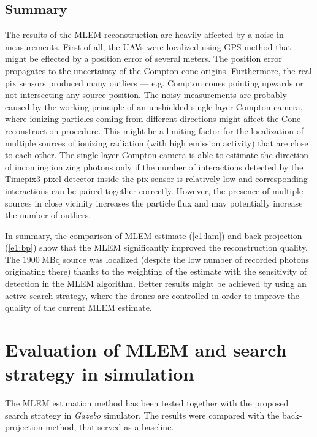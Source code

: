 \subsection{Summary}
The results of the \ac{MLEM} reconstruction are heavily affected by a noise in measurements.
First of all, the \ac{UAV}s were localized using \ac{GPS} method that might be effected by a position error of several meters.
The position error propagates to the uncertainty of the Compton cone origins.
Furthermore, the real \ac{pix} sensors produced many outliers --- e.g. Compton cones pointing upwards or not intersecting any source position. 
The noisy measurements are probably caused by the working principle of an unshielded single-layer Compton camera, where ionizing particles coming from different directions might affect the Cone reconstruction procedure.
This might be a limiting factor for the localization of multiple sources of ionizing radiation (with high emission activity) that are close to each other.
The single-layer Compton camera is able to estimate the direction of incoming ionizing photons only if the number of interactions detected by the Timepix3 pixel detector inside the \ac{pix} sensor is relatively low and corresponding interactions can be paired together correctly.
However, the presence of multiple sources in close vicinity increases the particle flux and may potentially increase the number of outliers.

In summary, the comparison of \ac{MLEM} estimate (\autoref{e1:lam}) and back-projection (\autoref{e1:bp}) show that the \ac{MLEM} significantly improved the reconstruction quality.
The $\SI{1900}{\mega\becquerel}$ source was localized (despite the low number of recorded photons originating there) 
thanks to the weighting of the estimate with the sensitivity of detection in the \ac{MLEM} algorithm.
Better results might be achieved by using an active search strategy, where the drones are controlled in order to improve the quality of the current \ac{MLEM} estimate.










\section{Evaluation of MLEM and search strategy in simulation\label{chap:exp2}}
The \ac{MLEM} estimation method has been tested together with the proposed search strategy in \textit{Gazebo} simulator. 
The results were compared with the back-projection method, that served as a baseline.

